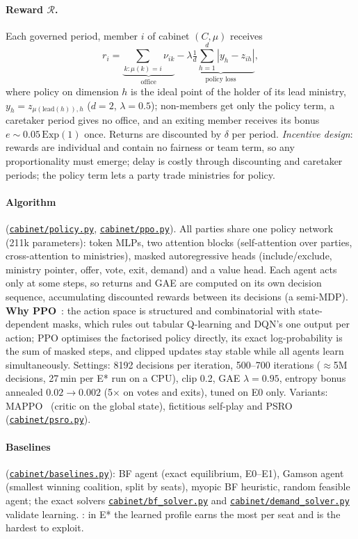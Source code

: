 \documentclass[10pt,twocolumn,a4paper]{article}
\newcommand{\repo}{https://github.com/bot2048/cabinet-bargaining-marl}
\newcommand{\code}[1]{\href{\repo/blob/main/#1}{\texttt{\footnotesize #1}}}
\begin{document}
\paragraph{Reward $\mathcal R$.} Each governed period, member $i$ of cabinet $(C,\mu)$ receives
\begin{equation}\label{eq:reward}
r_i=\underbrace{\textstyle\sum_{k:\mu(k)=i}\nu_{ik}}_{\text{office}}
-\underbrace{\lambda\tfrac1d\textstyle\sum_{h=1}^{d}|y_h-z_{ih}|}_{\text{policy loss}},
\end{equation}
where policy on dimension $h$ is the ideal point of the holder of its lead ministry,
$y_h=z_{\mu(\mathrm{lead}(h)),h}$ ($d=2$, $\lambda=0.5$); non-members get only the policy
term, a caretaker period gives no office, and an exiting member receives its bonus $e\sim0.05\,\mathrm{Exp}(1)$
once. Returns are discounted by $\delta$ per period. \emph{Incentive design}: rewards are individual and
contain no fairness or team term, so any proportionality must emerge; delay is costly through
discounting and caretaker periods; the policy term lets a party trade ministries for policy.

\paragraph{Algorithm} (\code{cabinet/policy.py}, \code{cabinet/ppo.py}). All parties share one policy
network (211k parameters): token MLPs, two attention blocks (self-attention over parties,
cross-attention to ministries), masked autoregressive heads (include/exclude, ministry pointer, offer,
vote, exit, demand) and a value head. Each agent acts only at some steps, so returns and GAE are computed
on its own decision sequence, accumulating discounted rewards between its decisions (a semi-MDP).
\textbf{Why PPO}~\cite{ppo}: the action space is structured and combinatorial with state-dependent masks,
which rules out tabular Q-learning and DQN's one output per action; PPO optimises the factorised
policy directly, its exact log-probability is the sum of masked steps, and clipped updates stay stable
while all agents learn simultaneously. Settings: 8192 decisions per iteration, 500--700 iterations
($\approx$5M decisions, 27\,min per E* run on a CPU), clip 0.2, GAE $\lambda=0.95$, entropy bonus
annealed $0.02\to0.002$ (5$\times$ on votes and exits), tuned on E0 only. Variants: MAPPO~\cite{mappo}
(critic on the global state), fictitious self-play and PSRO (\code{cabinet/psro.py}).

\paragraph{Baselines} (\code{cabinet/baselines.py}): BF agent (exact equilibrium, E0--E1), Gamson agent
(smallest winning coalition, split by seats), myopic BF heuristic, random feasible agent; the exact
solvers \code{cabinet/bf\_solver.py} and \code{cabinet/demand\_solver.py} validate learning.
: in E* the learned profile earns the most per seat and is the hardest to exploit.
\end{document}
